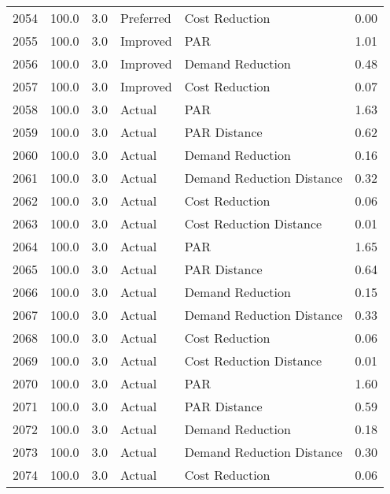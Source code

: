 \begin{longtable}{lrrllr}
2054 &        100.0 &     3.0 &      Preferred &             Cost Reduction &   0.00 \\
2055 &        100.0 &     3.0 &       Improved &                        PAR &   1.01 \\
2056 &        100.0 &     3.0 &       Improved &           Demand Reduction &   0.48 \\
2057 &        100.0 &     3.0 &       Improved &             Cost Reduction &   0.07 \\
2058 &        100.0 &     3.0 &         Actual &                        PAR &   1.63 \\
2059 &        100.0 &     3.0 &         Actual &               PAR Distance &   0.62 \\
2060 &        100.0 &     3.0 &         Actual &           Demand Reduction &   0.16 \\
2061 &        100.0 &     3.0 &         Actual &  Demand Reduction Distance &   0.32 \\
2062 &        100.0 &     3.0 &         Actual &             Cost Reduction &   0.06 \\
2063 &        100.0 &     3.0 &         Actual &    Cost Reduction Distance &   0.01 \\
2064 &        100.0 &     3.0 &         Actual &                        PAR &   1.65 \\
2065 &        100.0 &     3.0 &         Actual &               PAR Distance &   0.64 \\
2066 &        100.0 &     3.0 &         Actual &           Demand Reduction &   0.15 \\
2067 &        100.0 &     3.0 &         Actual &  Demand Reduction Distance &   0.33 \\
2068 &        100.0 &     3.0 &         Actual &             Cost Reduction &   0.06 \\
2069 &        100.0 &     3.0 &         Actual &    Cost Reduction Distance &   0.01 \\
2070 &        100.0 &     3.0 &         Actual &                        PAR &   1.60 \\
2071 &        100.0 &     3.0 &         Actual &               PAR Distance &   0.59 \\
2072 &        100.0 &     3.0 &         Actual &           Demand Reduction &   0.18 \\
2073 &        100.0 &     3.0 &         Actual &  Demand Reduction Distance &   0.30 \\
2074 &        100.0 &     3.0 &         Actual &             Cost Reduction &   0.06 \\

\end{longtable}
